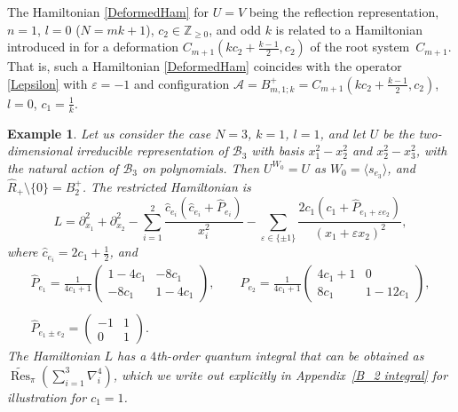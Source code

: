 \documentclass[12pt]{amsart}
\newcommand{\Z}{\mathbb Z}
\DeclareMathOperator{\Res}{Res}
\numberwithin{equation}{section}
\newtheorem{example}[theorem]{Example}
\theoremstyle{definition}
\begin{document}
The Hamiltonian \eqref{DeformedHam} for $U=V$ being the reflection representation, $n=1$, $l=0$ ($N= mk + 1$), $c_2 \in \Z_{\geq 0}$, and odd $k$ is related to a Hamiltonian
introduced in \cite{CGV} for a deformation $C_{m+1}(k c_2+\frac{k-1}2, c_2)$ of the root system~$C_{m+1}$. That is, such a Hamiltonian \eqref{DeformedHam} coincides with the operator \eqref{Lepsilon} with $\varepsilon=-1$ and configuration ${\mathcal A} = B_{m,1;k}^+ = C_{m+1}(k c_2+\frac{k-1}2, c_2)$, $l=0$, $c_1=\frac1k$. 


\begin{example}\label{B_2 example}
    Let us consider the case $N=3$, $k=1$, $l=1$, and let $U$ be the two-dimensional irreducible representation of $\mathcal{B}_3$ with basis $x_1^2 -x_2^2$ and $x_2^2 - x_3^2$, with the natural action of $\mathcal{B}_3$ on polynomials.
    Then $U^{W_0} = U$ as $W_0 = \langle s_{e_3} \rangle$, and $\widehat{R}_+ \setminus \{0\} = B_2^+$. 
    The restricted Hamiltonian is
    \begin{equation*}
        L = \partial_{x_1}^2 + \partial_{x_2}^2 - \sum_{i=1}^2\frac{\widehat{c}_{e_i}(\widehat{c}_{e_i} + \widehat{P}_{e_i})}{x_i^2}
       -\sum_{\varepsilon \in \{\pm 1\}}\frac{2c_1(c_1 + \widehat{P}_{e_1+ \varepsilon e_2})}{(x_1+ \varepsilon x_2)^2},
    \end{equation*}
    where $\widehat{c}_{e_i} = 2c_1 + \frac{1}{2}$, and
    \begin{equation*}
        \begin{array}{c}
        \widehat{P}_{e_1} = \frac{1}{4c_1 + 1} \begin{pmatrix}
            1-4c_1 & -8c_1 \\
            -8c_1 & 1-4c_1
        \end{pmatrix},
        \qquad \widehat{P}_{e_2} = \frac{1}{4c_1 + 1} \begin{pmatrix}
            4c_1 + 1 & 0 \\
            8c_1 & 1-12c_1
        \end{pmatrix}, \\ \ \\
        \widehat{P}_{e_1 \pm e_2} = \begin{pmatrix}
            -1 & 1 \\
            0 & 1
        \end{pmatrix}.
        \end{array}
    \end{equation*}
    The Hamiltonian $L$ has a $4$th-order quantum integral that can be obtained as $\widetilde{\Res}_{\pi}( \sum_{i = 1}^3 \nabla_i^4)$, which we write out explicitly in Appendix~\ref{B_2 integral} for illustration for $c_1 = 1$. 
    

\end{example}
\end{document}
